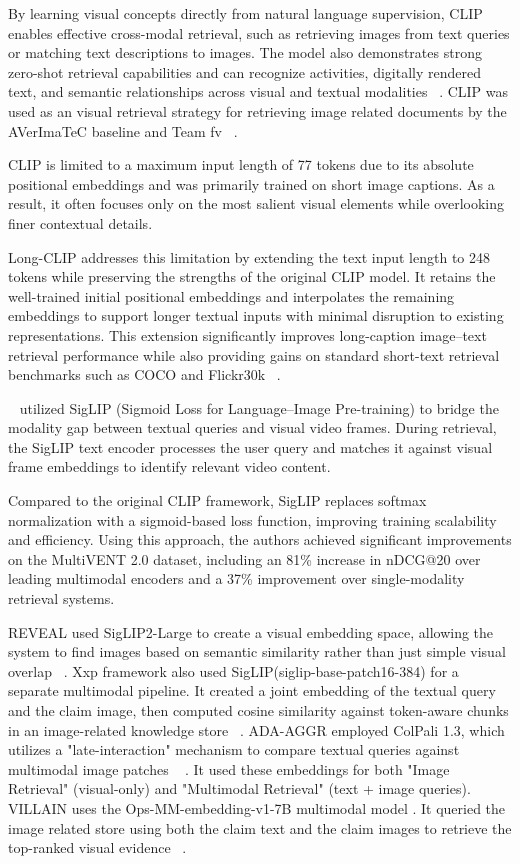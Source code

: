 By learning visual concepts directly from natural language supervision, CLIP enables effective cross-modal retrieval, such as retrieving images from text queries or matching text descriptions to images. The model also demonstrates strong zero-shot retrieval capabilities and can recognize activities, digitally rendered text, and semantic relationships across visual and textual modalities ~\cite{Radford2021Feb}. CLIP was used as an visual retrieval strategy for retrieving image related documents by the AVerImaTeC baseline and Team fv ~\cite{Cao2026Mar}.

CLIP is limited to a maximum input length of 77 tokens due to its absolute positional embeddings and was primarily trained on short image captions. As a result, it often focuses only on the most salient visual elements while overlooking finer contextual details.

Long-CLIP addresses this limitation by extending the text input length to 248 tokens while preserving the strengths of the original CLIP model. It retains the well-trained initial positional embeddings and interpolates the remaining embeddings to support longer textual inputs with minimal disruption to existing representations. This extension significantly improves long-caption image–text retrieval performance while also providing gains on standard short-text retrieval benchmarks such as COCO and Flickr30k ~\cite{Zhang2024Mar}.

~\citet{Samuel2025Jul} utilized SigLIP (Sigmoid Loss for Language–Image Pre-training) to bridge the modality gap between textual queries and visual video frames. During retrieval, the SigLIP text encoder processes the user query and matches it against visual frame embeddings to identify relevant video content.

Compared to the original CLIP framework, SigLIP replaces softmax normalization with a sigmoid-based loss function, improving training scalability and efficiency. Using this approach, the authors achieved significant improvements on the MultiVENT 2.0 dataset, including an 81\% increase in nDCG@20 over leading multimodal encoders and a 37\% improvement over single-modality retrieval systems.

REVEAL used SigLIP2-Large to create a visual embedding space, allowing the system to find images based on semantic similarity  rather than just simple visual overlap ~\cite{Tariq2026Mar}. Xxp framework also used SigLIP(siglip-base-patch16-384) for a separate multimodal pipeline. It created a joint embedding of the textual query and the claim image, then computed cosine similarity against token-aware chunks in an image-related knowledge store ~\cite{Tsoneva2026Mar}. ADA-AGGR employed ColPali 1.3, which utilizes a "late-interaction" mechanism to compare textual queries against multimodal image patches ~\cite{Upravitelev2026Mar}
. It used these embeddings for both "Image Retrieval" (visual-only) and "Multimodal Retrieval" (text + image queries). VILLAIN uses the Ops-MM-embedding-v1-7B multimodal model
. It queried the image related store using both the claim text and the claim images to retrieve the top-ranked visual evidence ~\cite{Jung2026Mar}.

